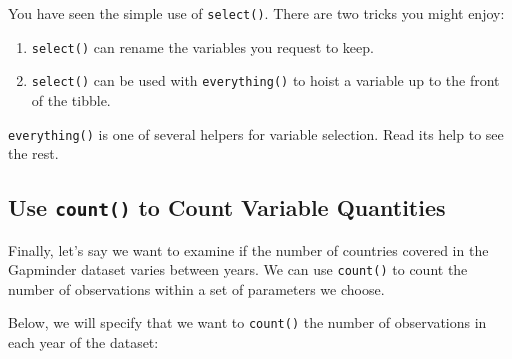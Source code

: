 \documentclass[
]{book}
\newenvironment{Shaded}{\begin{snugshade}}{\end{snugshade}}
\newcommand{\CommentTok}[1]{\textcolor[rgb]{0.56,0.35,0.01}{\textit{#1}}}
\newcommand{\DataTypeTok}[1]{\textcolor[rgb]{0.13,0.29,0.53}{#1}}
\newcommand{\DecValTok}[1]{\textcolor[rgb]{0.00,0.00,0.81}{#1}}
\newcommand{\KeywordTok}[1]{\textcolor[rgb]{0.13,0.29,0.53}{\textbf{#1}}}
\newcommand{\NormalTok}[1]{#1}
\newcommand{\OperatorTok}[1]{\textcolor[rgb]{0.81,0.36,0.00}{\textbf{#1}}}
\newcommand{\StringTok}[1]{\textcolor[rgb]{0.31,0.60,0.02}{#1}}
\providecommand{\tightlist}{%
  \setlength{\itemsep}{0pt}\setlength{\parskip}{0pt}}
\begin{document}
You have seen the simple use of \texttt{select()}. There are two tricks you might enjoy:

\begin{enumerate}
\def\labelenumi{\arabic{enumi}.}
\tightlist
\item
  \texttt{select()} can rename the variables you request to keep.
\item
  \texttt{select()} can be used with \texttt{everything()} to hoist a variable up to the front of the tibble.
\end{enumerate}

\begin{Shaded}
\end{Shaded}

\texttt{everything()} is one of several helpers for variable selection. Read its help to see the rest.

\hypertarget{use-count-to-count-variable-quantities}{%
\subsection{\texorpdfstring{Use \texttt{count()} to Count Variable Quantities}{Use count() to Count Variable Quantities}}\label{use-count-to-count-variable-quantities}}

Finally, let's say we want to examine if the number of countries covered in the Gapminder dataset varies between years. We can use \texttt{count()} to count the number of observations within a set of parameters we choose.

Below, we will specify that we want to \texttt{count()} the number of observations in each year of the dataset:

\begin{Shaded}
\end{Shaded}
\end{document}
